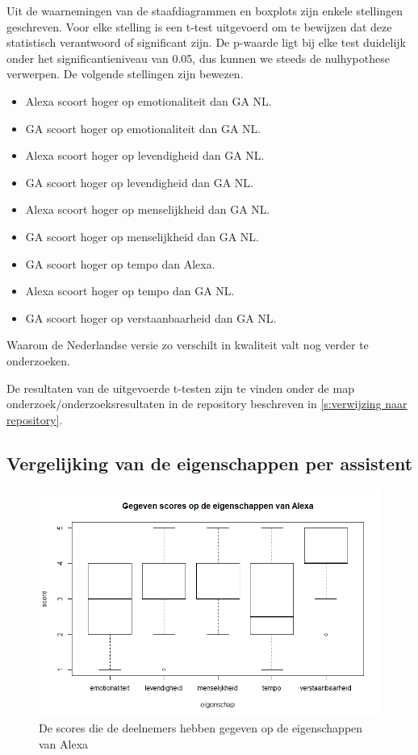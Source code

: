 Uit de waarnemingen van de staafdiagrammen en boxplots zijn enkele stellingen geschreven. Voor elke stelling is een t-test uitgevoerd om te bewijzen dat deze statistisch verantwoord of significant zijn. De p-waarde ligt bij elke test duidelijk onder het significantieniveau van 0.05, dus kunnen we steeds de nulhypothese verwerpen. De volgende stellingen zijn bewezen.
\begin{itemize}
    \item Alexa scoort hoger op emotionaliteit dan \gls{GA NL}.
    \item \gls{GA} scoort hoger op emotionaliteit dan \gls{GA NL}.
    \item Alexa scoort hoger op levendigheid dan \gls{GA NL}.
    \item \gls{GA} scoort hoger op levendigheid dan \gls{GA NL}.
    \item Alexa scoort hoger op menselijkheid dan \gls{GA NL}.
    \item \gls{GA} scoort hoger op menselijkheid dan \gls{GA NL}.
    \item \gls{GA} scoort hoger op tempo dan Alexa.
    \item Alexa scoort hoger op tempo dan \gls{GA NL}.
    \item \gls{GA} scoort hoger op verstaanbaarheid dan \gls{GA NL}.
\end{itemize}
Waarom de Nederlandse versie zo verschilt in kwaliteit valt nog verder te onderzoeken.

De resultaten van de uitgevoerde t-testen zijn te vinden onder de map onderzoek/onderzoeksresultaten in de repository beschreven in \ref{s:verwijzing naar repository}.

\subsection{Vergelijking van de eigenschappen per assistent}
\begin{figure}[H]
    \centering
    \includegraphics[width=0.9\linewidth]{../onderzoek/onderzoeksresultaten/vergelijking_eigenschappen_per_assistent/boxplot_score_eigenschappen_alexa}
    \caption{De scores die de deelnemers hebben gegeven op de eigenschappen van Alexa}
    \label{fig:boxplot-alexa}
\end{figure}

